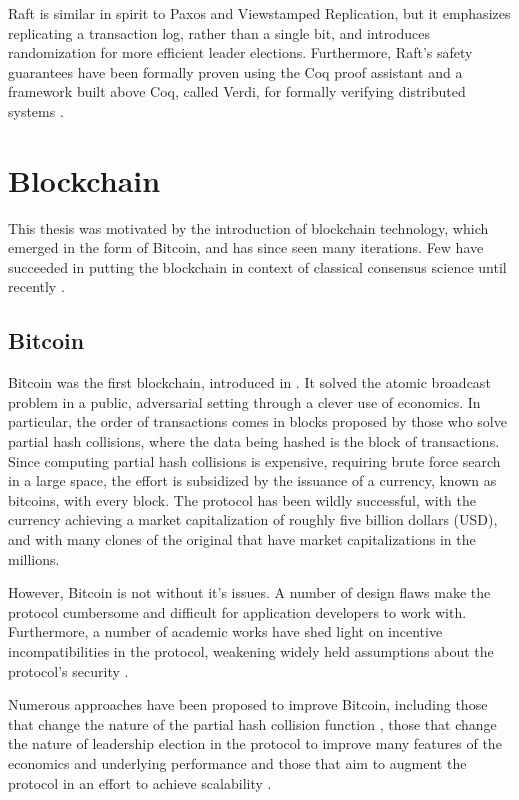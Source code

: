 Raft is similar in spirit to Paxos and Viewstamped Replication, but it emphasizes replicating a transaction log, 
rather than a single bit, and introduces randomization for more efficient leader elections.
Furthermore, Raft's safety guarantees have been formally proven using the Coq proof assistant \cite{woos2016planning}
and a framework built above Coq, called Verdi, for formally verifying distributed systems \cite{wilcox2015verdi}.

\section{Blockchain}

This thesis was motivated by the introduction of blockchain technology, which emerged in the form of Bitcoin,
and has since seen many iterations.
Few have succeeded in putting the blockchain in context of classical consensus science until recently \cite{vukolic11quest,cachin2016non,miller2016honey}.

\subsection{Bitcoin} 

Bitcoin was the first blockchain, introduced in \cite{bitcoin}.
It solved the atomic broadcast problem in a public, adversarial setting through a clever use of economics.
In particular, the order of transactions comes in blocks proposed by those who solve partial hash collisions,
where the data being hashed is the block of transactions.
Since computing partial hash collisions is expensive, requiring brute force search in a large space,
the effort is subsidized by the issuance of a currency, known as bitcoins, with every block.
The protocol has been wildly successful, with the currency achieving a market capitalization
of roughly five billion dollars (USD), and with many clones of the original that have market capitalizations in the millions.

However, Bitcoin is not without it's issues. A number of design flaws make the protocol cumbersome and difficult 
for application developers to work with.
Furthermore, a number of academic works have shed light on incentive incompatibilities in the protocol,
weakening widely held assumptions about the protocol's security \cite{eyal2014majority,courtois2014subversive}.

Numerous approaches have been proposed to improve Bitcoin,
including those that change the nature of the partial hash collision function \cite{miller2015nonoutsourceable},
those that change the nature of leadership election in the protocol to improve many features of the economics and underlying performance \cite{eyal2015bitcoin}
and those that aim to augment the protocol in an effort to achieve scalability \cite{back2014enabling,poon2015bitcoin}.

